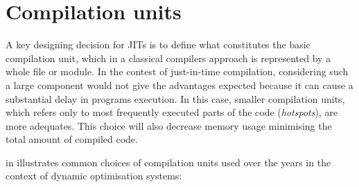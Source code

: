 \section{Compilation units}
A key designing decision for JITs is to define what constitutes the basic compilation unit, which in a classical compilers approach is represented by a whole file or module. In the contest of just-in-time compilation, considering such a large component would not give the advantages expected because it can cause a substantial delay in programs execution. In this case, smaller compilation units, which refers only to most frequently executed parts of the code (\textit{hotspots}), are more adequates. This choice will also decrease memory usage minimising the total amount of compiled code.

\citeauthor{schilling2013trace} in \cite{schilling2013trace} illustrates common choices of compilation units used over the years in the context of dynamic optimisation systems:

